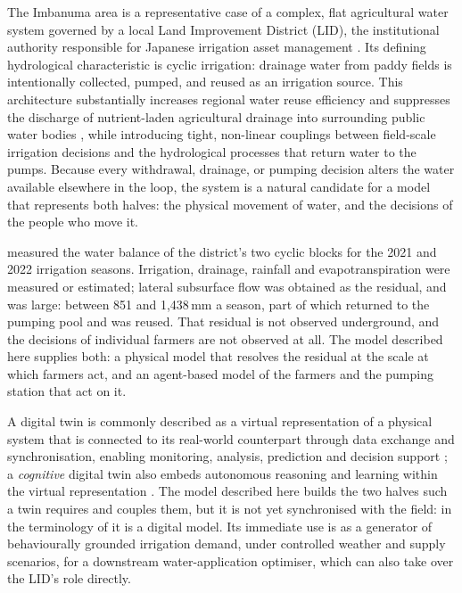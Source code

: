 \documentclass[11pt]{article}
\begin{document}
The Imbanuma area is a representative case of a complex, flat agricultural water system governed by a local Land Improvement District (LID), the institutional authority responsible for Japanese irrigation asset management \citep{Kada2005LID, Shiozawa2011}. Its defining hydrological characteristic is cyclic irrigation: drainage water from paddy fields is intentionally collected, pumped, and reused as an irrigation source. This architecture substantially increases regional water reuse efficiency and suppresses the discharge of nutrient-laden agricultural drainage into surrounding public water bodies \citep{Takeda2001Cyclic, Maruyama2008}, while introducing tight, non-linear couplings between field-scale irrigation decisions and the hydrological processes that return water to the pumps. Because every withdrawal, drainage, or pumping decision alters the water available elsewhere in the loop, the system is a natural candidate for a model that represents both halves: the physical movement of water, and the decisions of the people who move it.

\citet{Okura2025WaterBalance} measured the water balance of the district's two cyclic blocks for the 2021 and 2022 irrigation seasons. Irrigation, drainage, rainfall and evapotranspiration were measured or estimated; lateral subsurface flow was obtained as the residual, and was large: between 851 and 1,438\,mm a season, part of which returned to the pumping pool and was reused. That residual is not observed underground, and the decisions of individual farmers are not observed at all. The model described here supplies both: a physical model that resolves the residual at the scale at which farmers act, and an agent-based model of the farmers and the pumping station that act on it.

A digital twin is commonly described as a virtual representation of a physical system that is connected to its real-world counterpart through data exchange and synchronisation, enabling monitoring, analysis, prediction and decision support \citep{Kritzinger2018DigitalTwin, Jones2020DigitalTwin}; a \emph{cognitive} digital twin also embeds autonomous reasoning and learning within the virtual representation \citep{Tao2019DigitalTwin, Tao2021DigitalTwin, Rasheed2020DigitalTwin}. The model described here builds the two halves such a twin requires and couples them, but it is not yet synchronised with the field: in the terminology of \citet{Kritzinger2018DigitalTwin} it is a digital model. Its immediate use is as a generator of behaviourally grounded irrigation demand, under controlled weather and supply scenarios, for a downstream water-application optimiser, which can also take over the LID's role directly.
\end{document}
